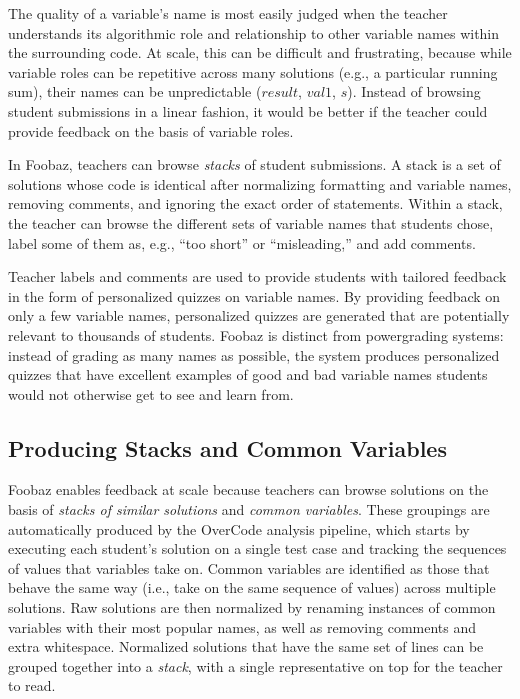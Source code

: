 The quality of a variable's name is most easily judged when the teacher understands its algorithmic role and relationship to other variable names within the surrounding code. At scale, this can be difficult and frustrating, because while variable roles can be repetitive across many solutions (e.g., a particular running sum), their names can be unpredictable ($result$, $val1$, $s$). Instead of browsing student submissions in a linear fashion, it would be better if the teacher could provide feedback on the basis of variable roles.

In Foobaz, teachers can browse \emph{stacks} of student submissions. A stack is a set of solutions whose code is identical after normalizing formatting and variable names, removing comments, and ignoring the exact order of statements. Within a stack, the teacher can browse the different sets of variable names that students chose, label some of them as, e.g., ``too short'' or ``misleading,'' and add comments. 

Teacher labels and comments are used to provide students with tailored feedback in the form of personalized quizzes on variable names. By providing feedback on only a few variable names, personalized quizzes are generated that are potentially relevant to thousands of students. Foobaz is distinct from powergrading systems: instead of grading as many names as possible, the system produces personalized quizzes that have excellent examples of good and bad variable names students would not otherwise get to see and learn from.

\subsection{Producing Stacks and Common Variables}
Foobaz enables feedback at scale because teachers can browse solutions on the basis of \emph{stacks of similar solutions} and \emph{common variables}. These groupings are automatically produced by the OverCode analysis pipeline, which starts by executing each student's solution on a single test case and tracking the sequences of values that variables take on. Common variables are identified as those that behave the same way (i.e., take on the same sequence of values) across multiple solutions. Raw solutions are then normalized by renaming instances of common variables with their most popular names, as well as removing comments and extra whitespace. Normalized solutions that have the same set of lines can be grouped together into a \emph{stack}, with a single representative on top for the teacher to read. 

